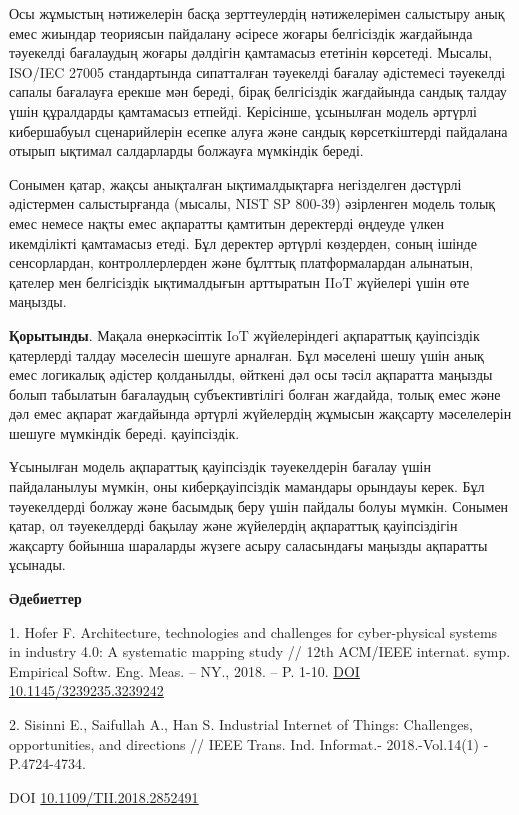 Осы жұмыстың нәтижелерін басқа зерттеулердің нәтижелерімен салыстыру
анық емес жиындар теориясын пайдалану әсіресе жоғары белгісіздік
жағдайында тәуекелді бағалаудың жоғары дәлдігін қамтамасыз ететінін
көрсетеді. Мысалы, ISO/IEC 27005 стандартында сипатталған тәуекелді
бағалау әдістемесі тәуекелді сапалы бағалауға ерекше мән береді, бірақ
белгісіздік жағдайында сандық талдау үшін құралдарды қамтамасыз етпейді.
Керісінше, ұсынылған модель әртүрлі кибершабуыл сценарийлерін есепке
алуға және сандық көрсеткіштерді пайдалана отырып ықтимал салдарларды
болжауға мүмкіндік береді.

Сонымен қатар, жақсы анықталған ықтималдықтарға негізделген дәстүрлі
әдістермен салыстырғанда (мысалы, NIST SP 800-39) әзірленген модель
толық емес немесе нақты емес ақпаратты қамтитын деректерді өңдеуде үлкен
икемділікті қамтамасыз етеді. Бұл деректер әртүрлі көздерден, соның
ішінде сенсорлардан, контроллерлерден және бұлттық платформалардан
алынатын, қателер мен белгісіздік ықтималдығын арттыратын IIoT жүйелері
үшін өте маңызды.

{\bfseries Қорытынды}. Мақала өнеркәсіптік IoT жүйелеріндегі ақпараттық
қауіпсіздік қатерлерді талдау мәселесін шешуге арналған. Бұл мәселені
шешу үшін анық емес логикалық әдістер қолданылды, өйткені дәл осы тәсіл
ақпаратта маңызды болып табылатын бағалаудың субъективтілігі болған
жағдайда, толық емес және дәл емес ақпарат жағдайында әртүрлі жүйелердің
жұмысын жақсарту мәселелерін шешуге мүмкіндік береді. қауіпсіздік.

Ұсынылған модель ақпараттық қауіпсіздік тәуекелдерін бағалау үшін
пайдаланылуы мүмкін, оны киберқауіпсіздік мамандары орындауы керек. Бұл
тәуекелдерді болжау және басымдық беру үшін пайдалы болуы мүмкін.
Сонымен қатар, ол тәуекелдерді бақылау және жүйелердің ақпараттық
қауіпсіздігін жақсарту бойынша шараларды жүзеге асыру саласындағы
маңызды ақпаратты ұсынады.

{\bfseries Әдебиеттер}

1. Hofer F. Architecture, technologies and challenges for cyber-physical
systems in industry 4.0: A systematic mapping study // 12th ACM/IEEE
internat. symp. Empirical Softw. Eng. Meas. -- NY., 2018. -- P. 1-10.
\href{https://doi.org/10.1145/3239235.3239242}{DOI
10.1145/3239235.3239242}

2. Sisinni E., Saifullah A., Han S. Industrial Internet of Things:
Challenges, opportunities, and directions // IEEE Trans. Ind. Informat.-
2018.-Vol.14(1) - P.4724-4734.

DOI
\href{https://doi.org/10.1109/TII.2018.2852491}{10.1109/TII.2018.2852491}

